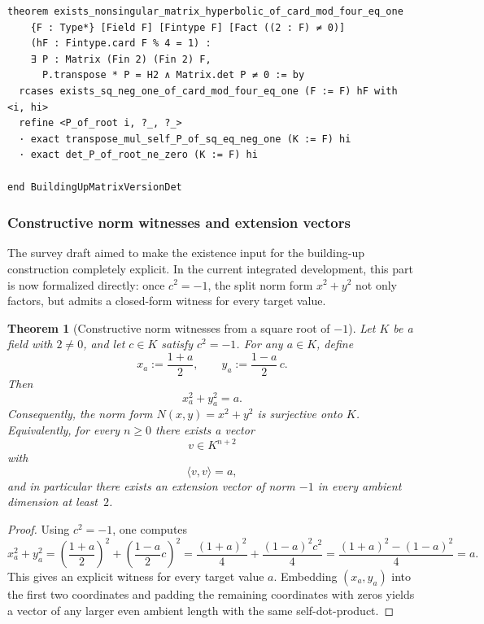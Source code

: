 \documentclass[12pt]{article}
\newtheorem{theorem}{Theorem}[section]
\begin{document}
\begin{lstlisting}[caption={Lean verification for Theorem~\ref{thm:hyperbolic-realization}.}]
theorem exists_nonsingular_matrix_hyperbolic_of_card_mod_four_eq_one
    {F : Type*} [Field F] [Fintype F] [Fact ((2 : F) ≠ 0)]
    (hF : Fintype.card F % 4 = 1) :
    ∃ P : Matrix (Fin 2) (Fin 2) F,
      P.transpose * P = H2 ∧ Matrix.det P ≠ 0 := by
  rcases exists_sq_neg_one_of_card_mod_four_eq_one (F := F) hF with <i, hi>
  refine <P_of_root i, ?_, ?_>
  · exact transpose_mul_self_P_of_sq_eq_neg_one (K := F) hi
  · exact det_P_of_root_ne_zero (K := F) hi

end BuildingUpMatrixVersionDet
\end{lstlisting}

\subsubsection{Constructive norm witnesses and extension vectors}

The survey draft aimed to make the existence input for the building-up construction completely explicit. In the current integrated development, this part is now formalized directly: once $c^2=-1$, the split norm form $x^2+y^2$ not only factors, but admits a closed-form witness for every target value.

\begin{theorem}[Constructive norm witnesses from a square root of $-1$]
\label{thm:norm-witness}
Let $K$ be a field with $2\neq 0$, and let $c\in K$ satisfy $c^2=-1$. For any $a\in K$, define
\[
x_a:=\frac{1+a}{2},
\qquad
y_a:=\frac{1-a}{2}\,c.
\]
Then
\[
x_a^2+y_a^2=a.
\]
Consequently, the norm form $N(x,y)=x^2+y^2$ is surjective onto $K$. Equivalently, for every $n\ge 0$ there exists a vector
\[
v\in K^{n+2}
\]
with
\[
\langle v,v\rangle=a,
\]
and in particular there exists an extension vector of norm $-1$ in every ambient dimension at least~$2$.
\end{theorem}

\begin{proof}
Using $c^2=-1$, one computes
\[
x_a^2+y_a^2
=
\left(\frac{1+a}{2}\right)^2+\left(\frac{1-a}{2}c\right)^2
=
\frac{(1+a)^2}{4}+\frac{(1-a)^2c^2}{4}
=
\frac{(1+a)^2-(1-a)^2}{4}
=
a.
\]
This gives an explicit witness for every target value $a$. Embedding $(x_a,y_a)$ into the first two coordinates and padding the remaining coordinates with zeros yields a vector of any larger even ambient length with the same self-dot-product.
\end{proof}
\end{document}
